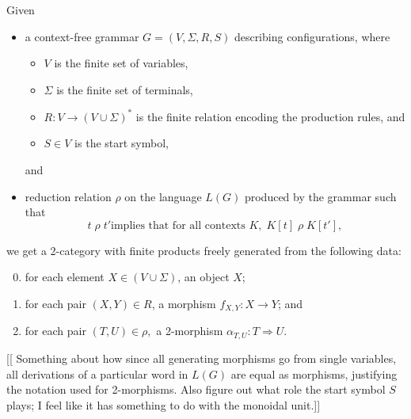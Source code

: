 \documentclass[]{acm_proc_article-sp}
\numberwithin{equation}{subsection}
\begin{document}
Given 
\begin{itemize}
  \item a context-free grammar $G = (V, \Sigma, R, S)$ describing configurations, where
  \begin{itemize}
    \item $V$ is the finite set of variables,
    \item $\Sigma$ is the finite set of terminals,
    \item $R\colon V \to (V \cup \Sigma)^*$ is the finite relation encoding the production rules, and
    \item $S\in V$ is the start symbol,
  \end{itemize}
  and
  \item reduction relation $\rho$ on the language $L(G)$ produced by the grammar such that
  \[t\;\rho\;t' \mbox{implies that for all contexts } K,\; K[t]\; \rho\; K[t'], \]
\end{itemize}
we get a 2-category with finite products freely generated from the following data:
\begin{enumerate}
  \setcounter{enumi}{-1}
  \item for each element $X \in (V \cup \Sigma)$, an object $X$;
  \item for each pair $(X, Y) \in R$, a morphism $f_{X,Y}\colon X \to Y$; and
  \item for each pair $(T, U) \in \rho,$ a 2-morphism $\alpha_{T,U}\colon T \Rightarrow U$.
\end{enumerate}
[[ Something about how since all generating morphisms go from single variables, all derivations of a particular word in  $L(G)$ are equal as morphisms, justifying the notation used for 2-morphisms.  Also figure out what role the start symbol $S$ plays; I feel like it has something to do with the monoidal unit.]]  
\end{document}

